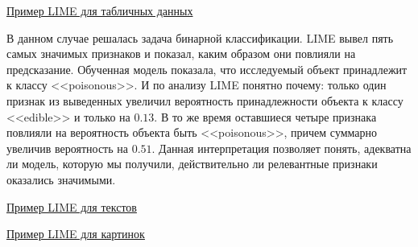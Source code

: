 \underline{Пример LIME для табличных данных}
\vspace{-3mm}

\begin{figure}[h]
\end{figure}

В данном случае решалась задача бинарной классификации. LIME вывел пять самых значимых признаков и показал, каким образом они повлияли на предсказание. Обученная модель показала, что исследуемый объект принадлежит к классу <<poisonous>>. И по анализу LIME понятно почему: только один признак из выведенных увеличил вероятность принадлежности объекта к классу <<edible>> и только на $0.13$. В то же время оставшиеся четыре признака повлияли на вероятность объекта быть <<poisonous>>, причем суммарно увеличив вероятность на $0.51$. Данная интерпретация позволяет понять, адекватна ли модель, которую мы получили, действительно ли релевантные признаки оказались значимыми.

\underline{Пример LIME для текстов}
\vspace{-3mm}

\begin{figure}[h]
\end{figure}

\underline{Пример LIME для картинок}
\vspace{-3mm}

\begin{figure}[h]
\end{figure}

